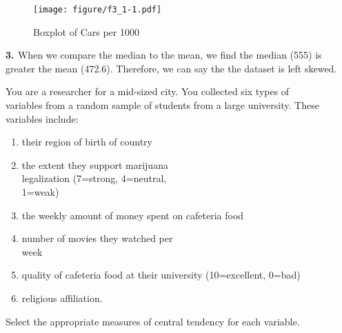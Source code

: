\documentclass[11pt]{book}\usepackage[]{graphicx}\usepackage[]{color}
\begin{document}
\begin{exercises}
\begin{solution}
\begin{figure}[htbp] %
   \centering
   \texttt{[image: figure/f3\_1-1.pdf]}
   \caption{Boxplot of Cars per 1000}
   \label{fig:f3_1}
\end{figure}

{\bf{3. }} When we compare the median to the mean, we find the median (555) is greater the mean (472.6).  Therefore, we can say the the dataset is left skewed.

  \end{solution}

  \begin{exercise} %

You are a researcher for a mid-sized city. You collected six types of \\ variables from a random sample of students from a large university.  These variables include:

  \begin{enumerate}
  \item their region of birth of country
  \item the extent they support marijuana \\ legalization (7=strong, 4=neutral, \\ 1=weak)
  \item the weekly amount of money spent on cafeteria food
  \item number of movies they watched per \\ week
  \item quality of cafeteria food at their university (10=excellent, 0=bad)
  \item religious affiliation.
  \end{enumerate}

Select the  appropriate measures of central  tendency for each variable.




  \end{exercise}

  \begin{exercise} %


\end{exercise}
\end{exercises}
\end{document}
